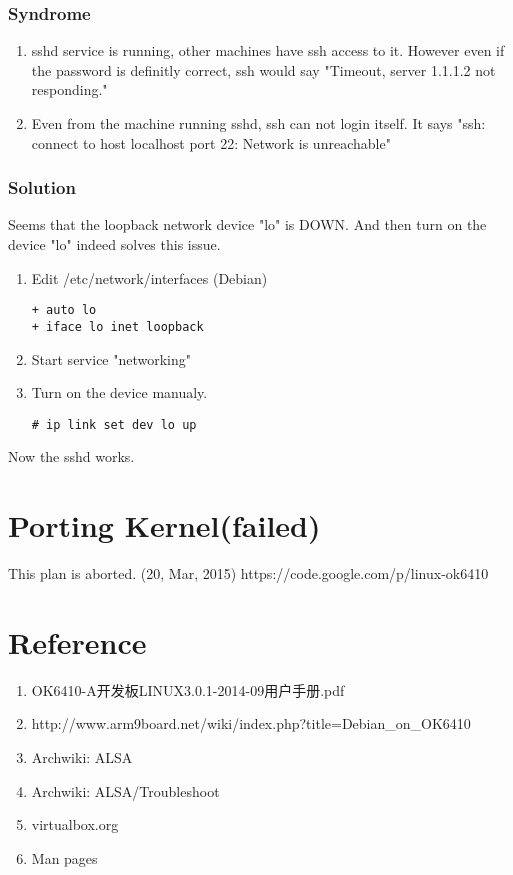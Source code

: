 \documentclass[11pt,a4paper]{article}
\begin{document}
\begin{CJK}{UTF8}{gbsn}
\subsubsection{Syndrome}
\begin{enumerate}
\item sshd service is running, other machines have ssh access to it. However
	even if the password is definitly correct, ssh would say 
	"Timeout, server 1.1.1.2 not responding."
\item Even from the machine running sshd, ssh can not login itself. It says
	"ssh: connect to host localhost port 22: Network is unreachable"
\end{enumerate}
\subsubsection{Solution}
Seems that the loopback network device "lo" is DOWN.
And then turn on the device "lo" indeed solves this issue.
\begin{enumerate}
\item Edit /etc/network/interfaces (Debian)
	\begin{verbatim}
+ auto lo
+ iface lo inet loopback
	\end{verbatim}
\item Start service "networking"
\item Turn on the device manualy.
	\begin{verbatim}
# ip link set dev lo up
	\end{verbatim}
\end{enumerate}
Now the sshd works.

\section{Porting Kernel(failed)}
This plan is aborted. (20, Mar, 2015)\newline
https://code.google.com/p/linux-ok6410

\newpage
\appendix
\section{Reference}
\begin{enumerate}
\item OK6410-A开发板LINUX3.0.1-2014-09用户手册.pdf
\item http://www.arm9board.net/wiki/index.php?title=Debian\_on\_OK6410
\item Archwiki: ALSA
\item Archwiki: ALSA/Troubleshoot
\item virtualbox.org
\item Man pages
\end{enumerate}


\end{CJK}
\end{document}
